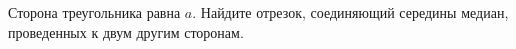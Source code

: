 \begin{ex}
	\begin{condition}
		Сторона треугольника равна \( a \). Найдите отрезок, соединяющий середины медиан, проведенных к двум другим сторонам.
	\end{condition}
\end{ex}